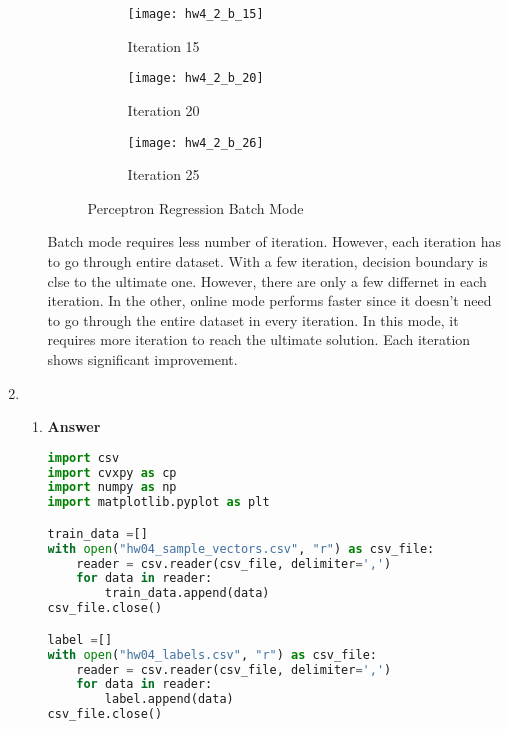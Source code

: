 \documentclass[11pt]{article}
\begin{document}
\begin{enumerate}[label=(\alph*)]
\begin{enumerate}[label=(\roman*)]
\begin{figure}[H]
\begin{subfigure}{.5\textwidth}
  \centering
  \texttt{[image: hw4\_2\_b\_15]}
  \caption{Iteration 15}
  \label{fig:hw4_2_b_15}
\end{subfigure}
\begin{subfigure}{.5\textwidth}
  \centering
  \texttt{[image: hw4\_2\_b\_20]}
  \caption{Iteration 20}
  \label{fig:hw4_2_b_20}
\end{subfigure}
\begin{subfigure}{.5\textwidth}
  \centering
  \texttt{[image: hw4\_2\_b\_26]}
  \caption{Iteration 25}
  \label{fig:hw4_2_b_26}
\end{subfigure}

\caption{Perceptron  Regression Batch Mode}
\label{fig:hw4_2_b_2}
\end{figure}

Batch mode requires less number of iteration. However, each iteration has to go through entire dataset. With a few iteration, decision boundary is clse to the ultimate one. However, there are only a few differnet in each iteration.
In the other, online mode performs faster since it doesn't need to go through the entire dataset in every iteration. In this mode, it requires more iteration to reach the ultimate solution. Each iteration shows significant improvement.

\end{enumerate}


\newpage

\item

\begin{enumerate}[label=(\roman*)]

\item  \textbf{Answer}

\begin{lstlisting}[language=Python, showstringspaces=false]
import csv
import cvxpy as cp
import numpy as np
import matplotlib.pyplot as plt

train_data =[]
with open("hw04_sample_vectors.csv", "r") as csv_file:
    reader = csv.reader(csv_file, delimiter=',')    
    for data in reader:
        train_data.append(data)        
csv_file.close()

label =[]
with open("hw04_labels.csv", "r") as csv_file:    
    reader = csv.reader(csv_file, delimiter=',')    
    for data in reader:
        label.append(data)        
csv_file.close()


\end{lstlisting}
\end{enumerate}
\end{enumerate}
\end{document}
